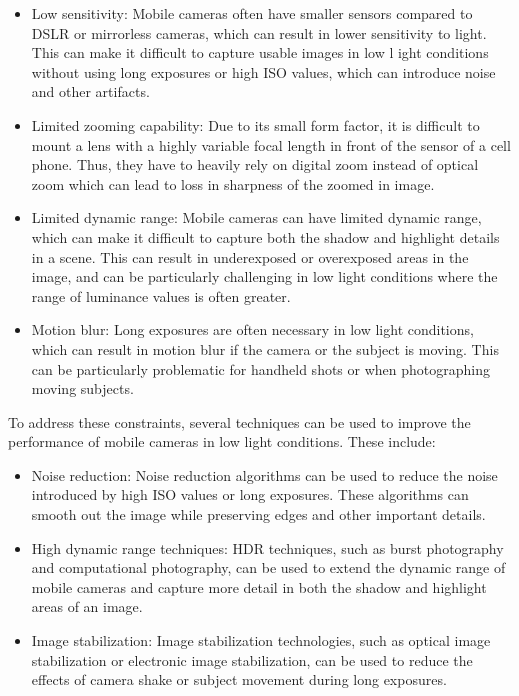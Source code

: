 \documentclass{egpubl}
\begin{document}
\begin{itemize}
    \item Low sensitivity: Mobile cameras often have smaller sensors compared 
          to DSLR or mirrorless cameras, which can result in lower sensitivity 
          to light. This can make it difficult to capture usable images in low l
          ight conditions without using long exposures or high ISO values, 
          which can introduce noise and other artifacts.

    \item Limited zooming capability: Due to its small form factor, it is difficult to mount a lens 
          with a highly variable focal length in front of the sensor of a cell phone.
          Thus, they have to heavily rely on digital zoom instead of optical zoom which can lead to loss 
          in sharpness of the zoomed in image.
    
    \item Limited dynamic range: Mobile cameras can have limited dynamic range, 
          which can make it difficult to capture both the shadow and highlight 
          details in a scene. This can result in underexposed or overexposed 
          areas in the image, and can be particularly challenging in low light 
          conditions where the range of luminance values is often greater.
    
    \item Motion blur: Long exposures are often necessary in low light conditions, 
          which can result in motion blur if the camera or the subject is moving. 
          This can be particularly problematic for handheld shots or when photographing 
          moving subjects.
\end{itemize}

To address these constraints, several techniques can be used to improve the performance 
of mobile cameras in low light conditions. These include:

\begin{itemize}
    \item Noise reduction: Noise reduction algorithms can be used to reduce the noise 
          introduced by high ISO values or long exposures. These algorithms can smooth 
          out the image while preserving edges and other important details.

    \item High dynamic range techniques: HDR techniques, such as burst photography 
          and computational photography, can be used to extend the dynamic range of mobile 
          cameras and capture more detail in both the shadow and highlight areas of an image.
    
    \item Image stabilization: Image stabilization technologies, such as optical image 
          stabilization or electronic image stabilization, can be used to reduce the 
          effects of camera shake or subject movement during long exposures.
\end{itemize}
\end{document}
